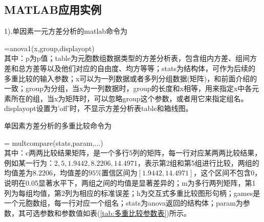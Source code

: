     \subsection{MATLAB应用实例}
        1).单因素一元方差分析的matlab命令为
        \par
        [p,table,stats] =anova1(x,group,displayopt)\\
        其中：p为p值；table为元胞数组数据类型的方差分析表，包含组内方差、组间方差和总方差等以及他们对应的自由度、均方等等；stats为结构体，可作为后续的多重比较的输入参数；x可以为一列数据或者多列分组数据(矩阵)，和前面介绍的一致；group为分组，当x为一列数据时，group的长度和x相等，用来指定x中各元素所在的组，当x为矩阵时，可以忽略group这个参数，或者用它来指定组名。displayopt设置为'off'时，不显示方差分析表table和箱线图。
        \par
        单因素方差分析的多重比较命令为
        \par
        [c,m,h,gnames] = multcompare(stats,param,$\dots$)\\
        其中：c两两比较结果矩阵，是一个多行5列的矩阵，每一行对应某两两比较结果，例如某一行为：$2,5,1.9442,8.2206,14.4971$，表示第2组和第5组进行比较，两组的均值差为8.2206，均值差的$95\%$置信区间为$[1.9442,14.4971]$，这个区间不包含0，说明在0.05显著水平下，两组之间的均值是显著差异的；m为多行两列矩阵，第1列为每组均值，第2列为相应的标准误差；h为交互式多重比较图形句柄；games是一个元胞数组，每一行对应一个组名；stats为anova返回的结构体；param为参数，其可选参数和参数值如表(\ref{tab:多重比较参数表})所示。
